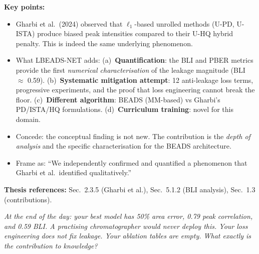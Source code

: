 \documentclass[11pt, letterpaper]{article}
\newcounter{qcounter}
\newcommand{\question}[1]{%
  \stepcounter{qcounter}%
  \begin{questionbox}[Q\theqcounter]%
    \itshape #1%
  \end{questionbox}%
}
\begin{document}
\begin{answerbox}
\textbf{Key points:}
\begin{itemize}[nosep]
  \item Gharbi et al.\ (2024) observed that $\ell_1$-based unrolled
        methods (U-PD, U-ISTA) produce biased peak intensities
        compared to their U-HQ hybrid penalty.  This is indeed the
        same underlying phenomenon.
  \item What LBEADS-NET adds:
        (a)~\textbf{Quantification}: the BLI and PBER metrics provide
        the first \emph{numerical characterisation} of the leakage
        magnitude (BLI $\approx$ 0.59).
        (b)~\textbf{Systematic mitigation attempt}: 12 anti-leakage
        loss terms, progressive experiments, and the proof that loss
        engineering cannot break the floor.
        (c)~\textbf{Different algorithm}: BEADS (MM-based) vs Gharbi's
        PD/ISTA/HQ formulations.
        (d)~\textbf{Curriculum training}: novel for this domain.
  \item Concede: the conceptual finding is not new.  The
        contribution is the \emph{depth of analysis} and the specific
        characterisation for the BEADS architecture.
  \item Frame as: ``We independently confirmed and quantified a
        phenomenon that Gharbi et al.\ identified qualitatively.''
\end{itemize}
\textbf{Thesis references:} Sec.~2.3.5 (Gharbi et al.), Sec.~5.1.2 (BLI analysis), Sec.~1.3 (contributions).
\end{answerbox}

\question{At the end of the day: your best model has 50\% area error,
0.79 peak correlation, and 0.59 BLI.  A practising chromatographer
would never deploy this.  Your loss engineering does not fix
leakage.  Your ablation tables are empty.  What exactly is the
contribution to knowledge?}
\end{document}
